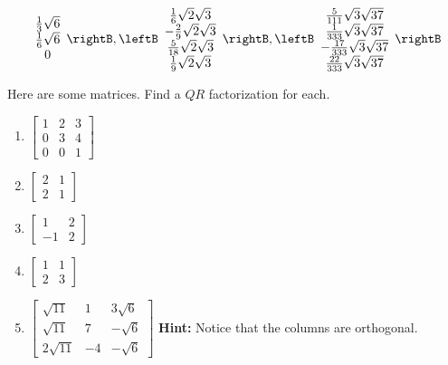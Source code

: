\begin{enumialphparenastyle}
\begin{ex}
\begin{sol}
\[\begin{array}{c}
\frac{1}{3}\sqrt{6} \\
\frac{1}{6}\sqrt{6} \\
0
\end{array}
\rightB ,\leftB
\begin{array}{c}
\frac{1}{6}\sqrt{2}\sqrt{3} \\
-\frac{2}{9}\sqrt{2}\sqrt{3} \\
\frac{5}{18}\sqrt{2}\sqrt{3} \\
\frac{1}{9}\sqrt{2}\sqrt{3}
\end{array}
\rightB ,\leftB
\begin{array}{c}
\frac{5}{111}\sqrt{3}\sqrt{37} \\
\frac{1}{333}\sqrt{3}\sqrt{37} \\
-\frac{17}{333}\sqrt{3}\sqrt{37} \\
\frac{22}{333}\sqrt{3}\sqrt{37}
\end{array}
\rightB
\]
\end{sol}
\end{ex}

\begin{ex} Here are some matrices. Find a $QR$ factorization for each.

\begin{enumerate}
\item $\left[ 
\begin{array}{ccc}
1 & 2 & 3 \\ 
0 & 3 & 4 \\ 
0 & 0 & 1
\end{array}
\right] $

\item $\left[ 
\begin{array}{cc}
2 & 1 \\ 
2 & 1
\end{array}
\right] \ $

\item $\left[ 
\begin{array}{rr}
1 & 2 \\ 
-1 & 2
\end{array}
\right] \ $

\item $\left[ 
\begin{array}{cc}
1 & 1 \\ 
2 & 3
\end{array}
\right] \ $

\item $\left[ 
\begin{array}{rrr}
\sqrt{11} & 1 & 3\sqrt{6} \\ 
\sqrt{11} & 7 & -\sqrt{6} \\ 
2\sqrt{11} & -4 & -\sqrt{6}
\end{array}
\right] \allowbreak $ \textbf{Hint: }Notice that the columns are orthogonal.
\end{enumerate}
\end{ex}


\end{enumialphparenastyle}
